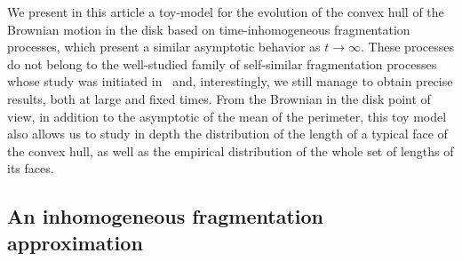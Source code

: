 \documentclass[AHL,Unicode,longabstracts,published]{cedram}
\begin{document}
We present in this article a toy-model for the evolution of the convex hull of the Brownian motion in the disk based on time-inhomogeneous fragmentation processes, which present a similar asymptotic behavior as $t \to \infty$. These processes do not belong to the well-studied family of self-similar fragmentation processes whose study was initiated in~\cite{BertoinSSF} and, interestingly, we still manage to obtain precise results, both at large and fixed times. From the Brownian in the disk point of view, in addition to the asymptotic of the mean of the perimeter, this toy model also allows us to study in depth the distribution of the length of a typical face of the convex hull, as well as the empirical distribution of the whole set of lengths of its faces.

\subsection{An inhomogeneous fragmentation approximation}\label{sec:intro_frag}
\end{document}
